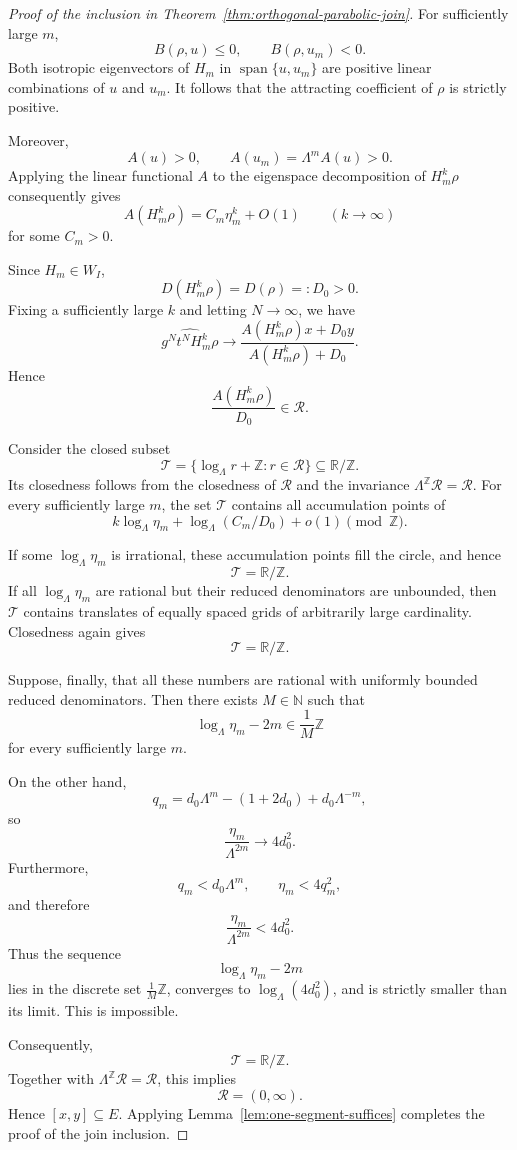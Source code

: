 \documentclass[11pt,reqno]{amsart}
\theoremstyle{plain}
\theoremstyle{definition}
\theoremstyle{remark}
\numberwithin{equation}{section}
\begin{document}
\begin{proof}[Proof of the inclusion in
Theorem~\ref{thm:orthogonal-parabolic-join}]
For sufficiently large $m$,
\[
B(\rho,u)\le0,\qquad B(\rho,u_m)<0.
\]
Both isotropic eigenvectors of $H_m$ in
$\operatorname{span}\{u,u_m\}$ are positive linear combinations
of $u$ and $u_m$. It follows that the attracting coefficient of
$\rho$ is strictly positive.

Moreover,
\[
A(u)>0,\qquad A(u_m)=\Lambda^mA(u)>0.
\]
Applying the linear functional $A$ to the eigenspace decomposition
of $H_m^k\rho$ consequently gives
\[
A(H_m^k\rho)=C_m\eta_m^k+O(1)
\qquad(k\to\infty)
\]
for some $C_m>0$.

Since $H_m\in W_I$,
\[
D(H_m^k\rho)=D(\rho)=:D_0>0.
\]
Fixing a sufficiently large $k$ and letting $N\to\infty$, we have
\[
\widehat{g^Nt^NH_m^k\rho}
\longrightarrow
\frac{A(H_m^k\rho)x+D_0y}
     {A(H_m^k\rho)+D_0}.
\]
Hence
\[
\frac{A(H_m^k\rho)}{D_0}\in\mathcal R.
\]

Consider the closed subset
\[
\mathcal T
=
\{\log_\Lambda r+\mathbb Z:r\in\mathcal R\}
\subseteq\mathbb R/\mathbb Z.
\]
Its closedness follows from the closedness of $\mathcal R$ and
the invariance $\Lambda^{\mathbb Z}\mathcal R=\mathcal R$.
For every sufficiently large $m$, the set $\mathcal T$ contains
all accumulation points of
\[
k\log_\Lambda\eta_m
+\log_\Lambda(C_m/D_0)+o(1)
\pmod{\mathbb Z}.
\]

If some $\log_\Lambda\eta_m$ is irrational, these accumulation
points fill the circle, and hence
\[
\mathcal T=\mathbb R/\mathbb Z.
\]
If all $\log_\Lambda\eta_m$ are rational but their reduced
denominators are unbounded, then $\mathcal T$ contains translates
of equally spaced grids of arbitrarily large cardinality.
Closedness again gives
\[
\mathcal T=\mathbb R/\mathbb Z.
\]

Suppose, finally, that all these numbers are rational with
uniformly bounded reduced denominators. Then there exists
$M\in\mathbb N$ such that
\[
\log_\Lambda\eta_m-2m\in\frac1M\mathbb Z
\]
for every sufficiently large $m$.

On the other hand,
\[
q_m=d_0\Lambda^m-(1+2d_0)+d_0\Lambda^{-m},
\]
so
\[
\frac{\eta_m}{\Lambda^{2m}}\longrightarrow4d_0^2.
\]
Furthermore,
\[
q_m<d_0\Lambda^m,
\qquad
\eta_m<4q_m^2,
\]
and therefore
\[
\frac{\eta_m}{\Lambda^{2m}}<4d_0^2.
\]
Thus the sequence
\[
\log_\Lambda\eta_m-2m
\]
lies in the discrete set $\frac1M\mathbb Z$, converges to
$\log_\Lambda(4d_0^2)$, and is strictly smaller than its limit.
This is impossible.

Consequently,
\[
\mathcal T=\mathbb R/\mathbb Z.
\]
Together with $\Lambda^{\mathbb Z}\mathcal R=\mathcal R$, this
implies
\[
\mathcal R=(0,\infty).
\]
Hence $[x,y]\subseteq E$. Applying
Lemma~\ref{lem:one-segment-suffices} completes the proof of the
join inclusion.
\end{proof}
\end{document}
